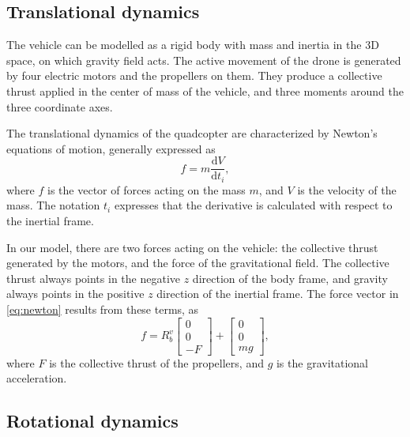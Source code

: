 \subsection{Translational dynamics}\label{sec:trans}

The vehicle can be modelled as a rigid body with mass and inertia in the 3D space, on which gravity field acts. The active movement of the drone is generated by  four electric motors and the propellers on them. They produce a collective thrust applied in the center of mass of the vehicle, and three moments around the three coordinate axes.

The translational dynamics of the quadcopter are characterized by Newton's equations of motion, generally expressed as
\begin{equation}\label{eq:newton}
f= m\frac{\mathrm{d} V}{\mathrm{d} t_i},
\end{equation}
where $f$ is the vector of forces acting on the mass $m$, and $V$ is the velocity of the mass. The notation $t_i$ expresses that the derivative is calculated with respect to the inertial frame.

In our model, there are two forces acting on the vehicle: the collective thrust generated by the motors, and the force of the gravitational field. The collective thrust always points in the negative $z$ direction of the body frame, and gravity always points in the positive $z$ direction of the inertial frame. The force vector in \eqref{eq:newton} results from these terms, as
\begin{equation}\label{eq:newtoneq}
f = R_b^v\begin{bmatrix} 0\\0\\-F \end{bmatrix} + \begin{bmatrix} 0\\0\\mg \end{bmatrix},
\end{equation}
where $F$ is the collective thrust of the propellers, and $g$ is the gravitational acceleration.
\newpage
\subsection{Rotational dynamics} \label{sec:rotation}

